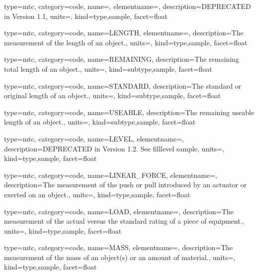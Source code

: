 {
  type=mtc,
  category=code,
  name=,
  elementname=,
  description={DEPRECATED in Version 1.1},
  units={},
  kind={type,sample},
  facet={\gls{float}}
}


{
  type=mtc,
  category=code,
  name={LENGTH},
  elementname=,
  description={The measurement of the length of an object.},
  units=,
  kind={type,sample},
  facet={\gls{float}}
}


{
  type=mtc,
  category=code,
  name={REMAINING},
  description={The remaining total length of an object.},
  units=,
  kind={subtype,sample},
  facet={\gls{float}}
}


{
  type=mtc,
  category=code,
  name={STANDARD},
  description={The standard or original length of an object.},
  units=,
  kind={subtype,sample},
  facet={\gls{float}}
}


{
  type=mtc,
  category=code,
  name={USEABLE},
  description={The remaining useable length of an object.},
  units=,
  kind={subtype,sample},
  facet={\gls{float}}
}


{
  type=mtc,
  category=code,
  name={LEVEL},
  elementname=,
  description={DEPRECATED in Version 1.2.  See \gls{filllevel sample}},
  units={},
  kind={type,sample},
  facet={\gls{float}}
}


{
  type=mtc,
  category=code,
  name={LINEAR\_FORCE},
  elementname=,
  description={The measurement of the push or pull introduced by an actuator or exerted on an object.},
  units=,
  kind={type,sample},
  facet={\gls{float}}
}


{
  type=mtc,
  category=code,
  name={LOAD},
  elementname=,
  description={The measurement of the actual versus the standard rating of a piece of equipment.},
  units=,
  kind={type,sample},
  facet={\gls{float}}
}


{
  type=mtc,
  category=code,
  name={MASS},
  elementname=,
  description={The measurement of the mass of an object(s) or an amount of material.},
  units=,
  kind={type,sample},
  facet={\gls{float}}
}


